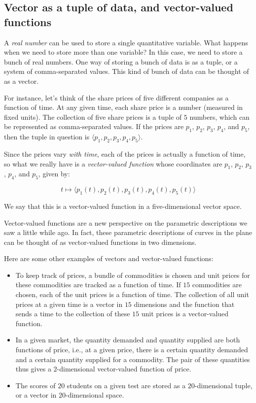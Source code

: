 \documentclass[10pt]{amsart}
\begin{document}
\subsection{Vector as a tuple of data, and vector-valued functions}

A {\em real number} can be used to store a single quantitative
variable. What happens when we need to store more than one variable?
In this case, we need to store a bunch of real numbers. One way of
storing a bunch of data is as a tuple, or a system of comma-separated
values. This kind of bunch of data can be thought of as a vector.

For instance, let's think of the share prices of five different
companies as a function of time. At any given time, each share price
is a number (measured in fixed units). The collection of five share
prices is a tuple of $5$ numbers, which can be represented as
comma-separated values. If the prices are $p_1$, $p_2$, $p_3$, $p_4$,
and $p_5$, then the tuple in question is $\langle
p_1,p_2,p_3,p_4,p_5\rangle$.

Since the prices vary {\em with time}, each of the prices is actually
a function of time, so what we really have is a {\em vector-valued
function} whose coordinates are $p_1$, $p_2$, $p_3$, $p_4$, and $p_5$,
given by:

$$t \mapsto \langle p_1(t),p_2(t),p_3(t),p_4(t),p_5(t)\rangle$$

We say that this is a vector-valued function in a five-dimensional
vector space.

Vector-valued functions are a new perspective on the parametric
descriptions we saw a little while ago. In fact, these parametric
descriptions of curves in the plane can be thought of as vector-valued
functions in two dimensions.

Here are some other examples of vectors and vector-valued functions:

\begin{itemize}
\item To keep track of prices, a bundle of commodities is chosen and
  unit prices for these commodities are tracked as a function of
  time. If $15$ commodities are chosen, each of the unit prices is a
  function of time. The collection of all unit prices at a given time
  is a vector in $15$ dimensions and the function that sends a time to
  the collection of these $15$ unit prices is a vector-valued function.
\item In a given market, the quantity demanded and quantity supplied
  are both functions of price, i.e., at a given price, there is a
  certain quantity demanded and a certain quantity supplied for a
  commodity. The pair of these quantities thus gives a $2$-dimensional
  vector-valued function of price.
\item The scores of $20$ students on a given test are stored as a
  $20$-dimensional tuple, or a vector in $20$-dimensional space.
\end{itemize}
\end{document}
